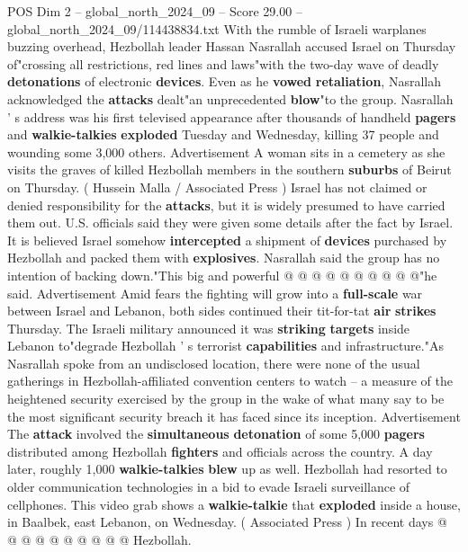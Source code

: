 \begin{textsample}{POS Dim 2 – global\_north\_2024\_09 – Score 29.00 – global\_north\_2024\_09/114438834.txt}  \label{ex:f2_pos_127}
With the rumble of Israeli warplanes buzzing overhead, Hezbollah leader Hassan Nasrallah accused Israel on Thursday of"crossing all restrictions, red lines and laws"with the two-day wave of deadly \textbf{detonations} of electronic \textbf{devices}.
Even as he \textbf{vowed} \textbf{retaliation}, Nasrallah acknowledged the \textbf{attacks} dealt"an unprecedented \textbf{blow}"to the group.
Nasrallah ' s address was his first televised appearance after thousands of handheld \textbf{pagers} and \textbf{walkie-talkies} \textbf{exploded} Tuesday and Wednesday, killing 37 people and wounding some 3,000 others.
Advertisement A woman sits in a cemetery as she visits the graves of killed Hezbollah members in the southern \textbf{suburbs} of Beirut on Thursday. ( Hussein Malla / Associated Press ) Israel has not claimed or denied responsibility for the \textbf{attacks}, but it is widely presumed to have carried them out.
U.S. officials said they were given some details after the fact by Israel.
It is believed Israel somehow \textbf{intercepted} a shipment of \textbf{devices} purchased by Hezbollah and packed them with \textbf{explosives}.
Nasrallah said the group has no intention of backing down."This big and powerful @ @ @ @ @ @ @ @ @ @"he said.
Advertisement Amid fears the fighting will grow into a \textbf{full-scale} war between Israel and Lebanon, both sides continued their tit-for-tat \textbf{air} \textbf{strikes} Thursday.
The Israeli military announced it was \textbf{striking} \textbf{targets} inside Lebanon to"degrade Hezbollah ' s terrorist \textbf{capabilities} and infrastructure."As Nasrallah spoke from an undisclosed location, there were none of the usual gatherings in Hezbollah-affiliated convention centers to watch -- a measure of the heightened security exercised by the group in the wake of what many say to be the most significant security breach it has faced since its inception.
Advertisement The \textbf{attack} involved the \textbf{simultaneous} \textbf{detonation} of some 5,000 \textbf{pagers} distributed among Hezbollah \textbf{fighters} and officials across the country.
A day later, roughly 1,000 \textbf{walkie-talkies} \textbf{blew} up as well.
Hezbollah had resorted to older communication technologies in a bid to evade Israeli surveillance of cellphones.
This video grab shows a \textbf{walkie-talkie} that \textbf{exploded} inside a house, in Baalbek, east Lebanon, on Wednesday. ( Associated Press ) In recent days @ @ @ @ @ @ @ @ @ @ Hezbollah.

\end{textsample}
